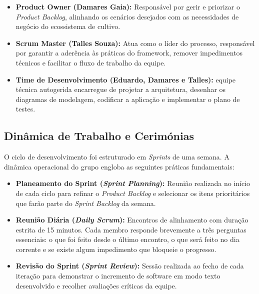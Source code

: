 \documentclass[a4paper,12pt]{article}
\begin{document}
\begin{itemize}[leftmargin=*]
    \item \textbf{Product Owner (Damares Gaia):} Responsável por gerir e priorizar o \textit{Product Backlog}, alinhando os cenários desejados com as necessidades de negócio do ecossistema de cultivo.
    \item \textbf{Scrum Master (Talles Souza):} Atua como o líder do processo, responsável por garantir a aderência às práticas do framework, remover impedimentos técnicos e facilitar o fluxo de trabalho da equipe.
    \item \textbf{Time de Desenvolvimento (Eduardo, Damares e Talles):} equipe técnica autogerida encarregue de projetar a arquitetura, desenhar os diagramas de modelagem, codificar a aplicação e implementar o plano de testes.
\end{itemize}

\subsection{Dinâmica de Trabalho e Cerimónias}
O ciclo de desenvolvimento foi estruturado em \textit{Sprints} de uma semana. A dinâmica operacional do grupo engloba as seguintes práticas fundamentais:
\begin{itemize}[leftmargin=*]
    \item \textbf{Planeamento do Sprint (\textit{Sprint Planning}):} Reunião realizada no início de cada ciclo para refinar o \textit{Product Backlog} e selecionar os itens prioritários que farão parte do \textit{Sprint Backlog} da semana.
    \item \textbf{Reunião Diária (\textit{Daily Scrum}):} Encontros de alinhamento com duração estrita de 15 minutos. Cada membro responde brevemente a três perguntas essenciais: o que foi feito desde o último encontro, o que será feito no dia corrente e se existe algum impedimento que bloqueie o progresso.
    \item \textbf{Revisão do Sprint (\textit{Sprint Review}):} Sessão realizada ao fecho de cada iteração para demonstrar o incremento de software em modo texto desenvolvido e recolher avaliações críticas da equipe.
\end{itemize}

\vspace{2em}

\end{document}
